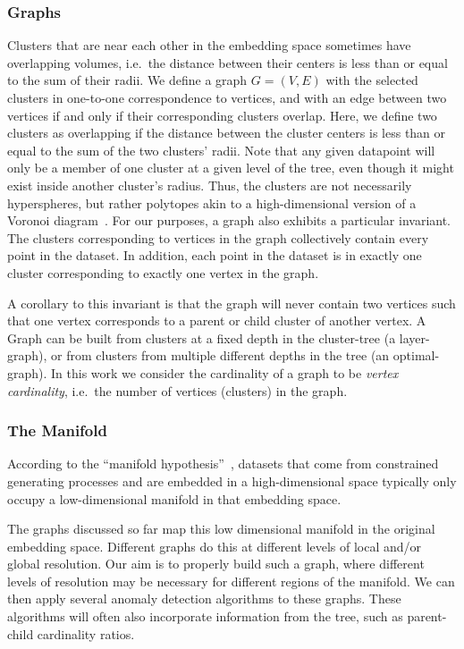 \subsubsection{Graphs}
Clusters that are near each other in the embedding space sometimes have overlapping volumes, i.e.\ the distance between their centers is less than or equal to the sum of their radii.
We define a graph $G=(V,E)$ with the selected clusters in one-to-one correspondence to vertices, and with an edge between two vertices if and only if their corresponding clusters overlap.
Here, we define two clusters as overlapping if the distance between the cluster centers is less than or equal to the sum of the two clusters' radii.
Note that any given datapoint will only be a member of one cluster at a given level of the tree, even though it might exist inside another cluster's radius.
Thus, the clusters are not necessarily hyperspheres, but rather polytopes akin to a high-dimensional version of a Voronoi diagram~\cite{voronoi1908nouvelles}.
For our purposes, a graph also exhibits a particular invariant.
The clusters corresponding to vertices in the graph collectively contain every point in the dataset.
In addition, each point in the dataset is in exactly one cluster corresponding to exactly one vertex in the graph.

A corollary to this invariant is that the graph will never contain two vertices such that one vertex corresponds to a parent or child cluster of another vertex.
A Graph can be built from clusters at a fixed depth in the cluster-tree (a layer-graph), or from clusters from multiple different depths in the tree (an optimal-graph).
In this work we consider the cardinality of a graph to be \textit{vertex cardinality}, i.e.\ the number of vertices (clusters) in the graph.

\subsubsection{The Manifold}
According to the ``manifold hypothesis''~\cite{fefferman2016testing},
datasets that come from constrained generating processes and are embedded in a high-dimensional space typically only occupy a low-dimensional manifold in that embedding space.

The graphs discussed so far map this low dimensional manifold in the original embedding space.
Different graphs do this at different levels of local and/or global resolution.
Our aim is to properly build such a graph, where different levels of resolution may be necessary for different regions of the manifold.
We can then apply several anomaly detection algorithms to these graphs.
These algorithms will often also incorporate information from the tree, such as parent-child cardinality ratios.

